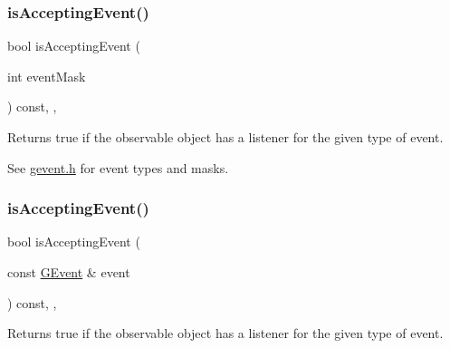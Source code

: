 \mbox{\label{classGObservable_aeec1adc19aa0f33de62390686ee1382c}} 
\subsubsection{\texorpdfstring{is\+Accepting\+Event()}{isAcceptingEvent()}\hspace{0.1cm}{\footnotesize\ttfamily [1/3]}}
{\footnotesize\ttfamily bool is\+Accepting\+Event (\begin{DoxyParamCaption}\item[{int}]{event\+Mask }\end{DoxyParamCaption}) const\hspace{0.3cm}{\ttfamily [protected]}, {\ttfamily [virtual]}, {\ttfamily [inherited]}}



Returns true if the observable object has a listener for the given type of event. 

See \mbox{\hyperlink{gevent_8h_source}{gevent.\+h}} for event types and masks. \mbox{\label{classGObservable_aa31c73145a29dcb92848a92e0cfaea41}} 
\subsubsection{\texorpdfstring{is\+Accepting\+Event()}{isAcceptingEvent()}\hspace{0.1cm}{\footnotesize\ttfamily [2/3]}}
{\footnotesize\ttfamily bool is\+Accepting\+Event (\begin{DoxyParamCaption}\item[{const \mbox{\hyperlink{classGEvent}{G\+Event}} \&}]{event }\end{DoxyParamCaption}) const\hspace{0.3cm}{\ttfamily [protected]}, {\ttfamily [virtual]}, {\ttfamily [inherited]}}



Returns true if the observable object has a listener for the given type of event. 

\mbox{\label{classGObservable_a3b1c689267eda44e65a2213e7de38b23}} 
